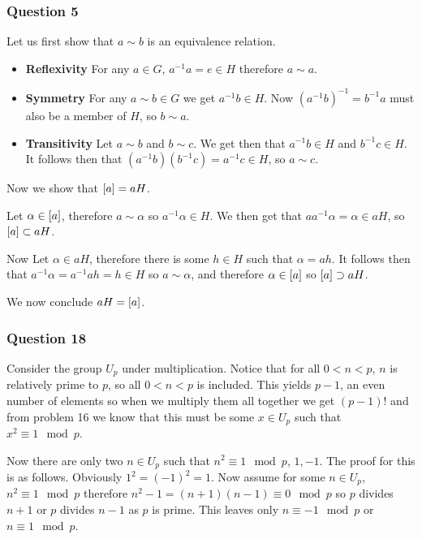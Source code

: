 \documentclass{article}
\begin{document}
\subsubsection{Question 5}

Let us first show that $a\sim b$ is an equivalence relation.
\begin{itemize}
	\item \textbf{Reflexivity} For any $a \in G$, $a^{-1}a = e \in H$ therefore $a \sim a$.
	\item \textbf{Symmetry} For any $a\sim b \in G$ we get $a^{-1}b \in H$. Now $\left(a^{-1}b\right)^{-1} = b^{-1}a$ must also be a member of $H$, so $b \sim a$.
	\item \textbf{Transitivity} Let $a \sim b$ and $b \sim c$. We get then that $a^{-1}b \in H$ and $b^{-1}c \in H$. It follows then that $\left(a^{-1}b\right)\left(b^{-1}c\right) = a^{-1}c \in H$, so $a \sim c$.
\end{itemize}
Now we show that $\left[{a}\right] = aH$.

Let $\alpha \in \left[{a}\right]$, therefore $a \sim \alpha$ so $a^{-1}\alpha \in H$. We then get that $aa^{-1}\alpha = \alpha \in aH$, so $\left[{a}\right] \subset aH$.

Now Let $\alpha \in aH$, therefore there is some $h \in H$ such that $\alpha = ah$. It follows then that $a^{-1}\alpha = a^{-1}ah = h \in H$ so $a \sim \alpha$, and therefore $\alpha\in\left[{a}\right]$ so $\left[{a}\right] \supset aH$.

We now conclude $aH = \left[{a}\right]$.

\subsubsection{Question 18}

Consider the group $U_p$ under multiplication. Notice that for all $0 < n < p$, $n$ is relatively prime to $p$, so all $0 < n < p$ is included. This yields $p-1$, an even number of elements so when we multiply them all together we get $(p-1)!$ and from problem 16 we know that this must be some $x \in U_p$ such that $x^2 \equiv 1 \mod p$.

Now there are only two $n \in U_p$ such that $n^2 \equiv 1 \mod p$, $1, -1$. The proof for this is as follows. Obviously $1^2 = (-1)^2 = 1$. Now assume for some $n \in U_p$, $n^2 \equiv 1 \mod p$ therefore $n^2 -1 = (n+1)(n-1) \equiv 0 \mod p$ so $p$ divides $n+1$ or $p$ divides $n-1$ as $p$ is prime. This leaves only $n \equiv -1 \mod p$ or $n \equiv 1 \mod p$.
\end{document}

